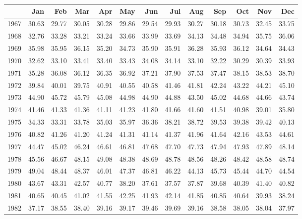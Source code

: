 \begin{longtable}{rrrrrrrrrrrrr}
  \hline
 & Jan & Feb & Mar & Apr & May & Jun & Jul & Aug & Sep & Oct & Nov & Dec \\ 
  \hline
1967 & 30.63 & 29.77 & 30.05 & 30.28 & 29.86 & 29.54 & 29.93 & 30.27 & 30.18 & 30.73 & 32.45 & 33.75 \\ 
  1968 & 32.76 & 33.28 & 33.21 & 33.24 & 33.66 & 33.99 & 33.69 & 34.13 & 34.48 & 34.94 & 35.75 & 36.06 \\ 
  1969 & 35.98 & 35.95 & 36.15 & 35.20 & 34.73 & 35.90 & 35.91 & 36.28 & 35.93 & 36.12 & 34.64 & 34.43 \\ 
  1970 & 32.62 & 33.10 & 33.41 & 33.40 & 33.43 & 34.08 & 34.14 & 33.10 & 32.22 & 30.29 & 30.39 & 33.93 \\ 
  1971 & 35.28 & 36.08 & 36.12 & 36.35 & 36.92 & 37.21 & 37.90 & 37.53 & 37.47 & 38.15 & 38.53 & 38.70 \\ 
  1972 & 39.84 & 40.01 & 39.75 & 40.91 & 40.55 & 40.58 & 41.46 & 41.81 & 42.24 & 43.22 & 44.21 & 45.10 \\ 
  1973 & 44.90 & 45.72 & 45.79 & 45.08 & 44.98 & 44.90 & 44.88 & 43.50 & 45.02 & 44.68 & 44.66 & 43.74 \\ 
  1974 & 41.46 & 41.33 & 41.36 & 41.11 & 41.23 & 41.80 & 41.66 & 41.60 & 41.51 & 40.98 & 39.01 & 35.80 \\ 
  1975 & 34.33 & 33.31 & 33.78 & 35.03 & 35.97 & 36.36 & 38.21 & 38.72 & 39.53 & 39.38 & 39.42 & 40.13 \\ 
  1976 & 40.82 & 41.26 & 41.20 & 41.24 & 41.31 & 41.14 & 41.37 & 41.96 & 41.64 & 42.16 & 43.53 & 44.61 \\ 
  1977 & 44.47 & 45.02 & 46.24 & 46.61 & 46.81 & 47.68 & 47.70 & 47.73 & 47.94 & 47.93 & 47.89 & 48.14 \\ 
  1978 & 45.56 & 46.67 & 48.15 & 49.08 & 48.38 & 48.69 & 48.78 & 48.56 & 48.26 & 48.42 & 48.58 & 48.74 \\ 
  1979 & 49.04 & 48.44 & 48.37 & 46.01 & 47.37 & 46.81 & 46.22 & 44.13 & 45.73 & 45.44 & 44.70 & 44.54 \\ 
  1980 & 43.67 & 43.31 & 42.57 & 40.77 & 38.20 & 37.61 & 37.57 & 37.87 & 39.68 & 40.39 & 41.40 & 40.82 \\ 
  1981 & 40.65 & 40.45 & 41.02 & 41.55 & 42.25 & 41.93 & 42.14 & 41.85 & 40.85 & 40.64 & 39.93 & 38.24 \\ 
  1982 & 37.17 & 38.55 & 38.40 & 39.16 & 39.17 & 39.46 & 39.69 & 39.16 & 38.58 & 38.05 & 38.04 & 37.97 \\ 

\end{longtable}
